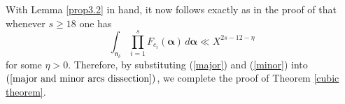 \documentclass{amsart}%
\numberwithin{equation}{section}
\theoremstyle{remark}
\newcommand{\1}{\mathbbm{1}}
\begin{document}

With Lemma \ref{prop3.2} in hand, it now follows exactly as in the proof of \cite[Lemma 2.2]{ky2026} that whenever $s \ge 18$ one has
\begin{equation}\label{minor}
    \int_{\mathfrak{n}_{\delta}} \prod_{i=1}^s F_{c_i}(\boldsymbol{\alpha}) \, d\boldsymbol{\alpha}\ll X^{2s-12-\eta}
\end{equation}
for some $\eta>0.$ Therefore, by substituting (\ref{major}) and (\ref{minor}) into $(\ref{major and minor arcs dissection})$, we complete the proof of Theorem \ref{cubic theorem}.
\end{document}

